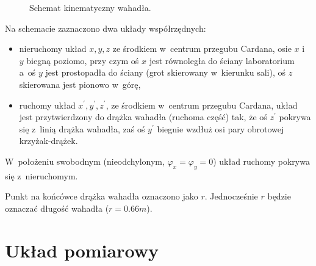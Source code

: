 \documentclass[paper=a4,DIV=12]{lpas}
\begin{document}
\begin{figure}[htbp]
  \caption{Schemat kinematyczny wahadła.}
  \label{fig:7YP7N}
\end{figure}
Na schemacie zaznaczono dwa układy współrzędnych:
\begin{itemize}
  \item nieruchomy układ $x,y,z$ ze środkiem w~centrum przegubu Cardana, osie
        $x$ i~$y$ biegną poziomo, przy czym oś $x$ jest równoległa do ściany
        laboratorium a~oś $y$ jest prostopadła do ściany (grot skierowany
        w~kierunku sali), oś $z$ skierowana jest pionowo w~górę,
  \item ruchomy układ $x^{\prime}, y^{\prime}, z^{\prime}$, ze środkiem w~centrum przegubu
        Cardana, układ jest przytwierdzony do drążka wahadła (ruchoma część)
        tak, że oś $z^{\prime}$ pokrywa się z~linią drążka wahadła, zaś oś $y^{\prime}$
        biegnie wzdłuż osi pary obrotowej krzyżak-drążek.
\end{itemize}
W~położeniu swobodnym (nieodchylonym, $\varphi_x = \varphi_y=0$) układ
ruchomy pokrywa się z~nieruchomym.

Punkt na końcówce drążka wahadła oznaczono jako $r$. Jednocześnie
$r$ będzie oznaczać długość wahadła ($r = 0.66m$).


\section{Układ pomiarowy}
\label{sec:Z2CJY}
\end{document}
